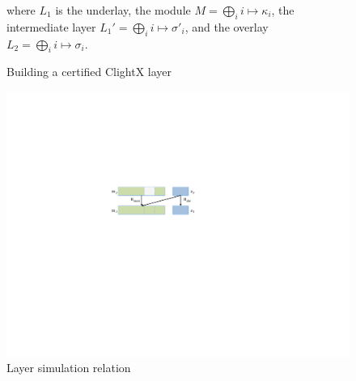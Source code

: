 \begin{figure}[t]
    \begin{prooftree}
    \end{prooftree}
    where $L_1$ is the underlay, the module $M = \bigoplus_i i \mapsto \kappa_i$, the intermediate layer $L_1' = \bigoplus_i i \mapsto \sigma'_i$, and the overlay $L_2 = \bigoplus_i i \mapsto \sigma_i$.
    \caption{Building a certified ClightX layer}
    \label{fig:lprooftree}
\end{figure}

\begin{figure}[tp]
\begin{center}
\includegraphics[scale=.7]{figs/layersimulation}
\caption{Layer simulation relation}
\label{fig:layersimulation}
\end{center}
\afterpage{\FloatBarrier}
\end{figure}

